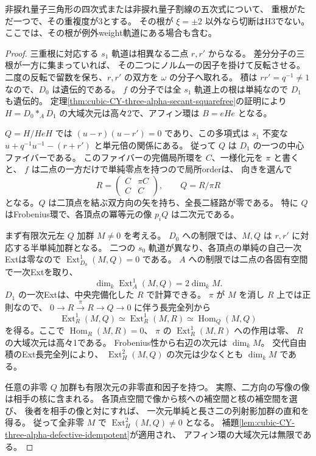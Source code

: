 \begin{proposition}\label{prop:cubic-CY-three-alpha-triple-unramified-root}
非捩れ量子三角形の四次式または非捩れ量子割線の五次式について、
重根がただ一つで、その重複度が3とする。
その根が $\xi=\pm2$ 以外なら切断はH3でない。
ここでは、その根が例外weight軌道にある場合も含む。
\end{proposition}
\begin{proof}
三重根に対応する $s_1$ 軌道は相異なる二点 $r,r'$ からなる。
差分分子の三根が一方に集まっていれば、
その二つにノルム一の因子を掛けて反転させる。
二度の反転で留数を保ち、$r,r'$ の双方を $\omega$ の分子へ取れる。
積は $rr'=q^{-1}\ne1$ なので、$D_0$ は遺伝的である。
$f$ の分子では全 $s_1$ 軌道上の根は単純なので $D_1$ も遺伝的。
定理\ref{thm:cubic-CY-three-alpha-secant-squarefree}の証明により
$H=D_0*_A D_1$ の大域次元は高々2で、アフィン環は $B=eHe$ となる。

$Q=H/HeH$ では $(u-r)(u-r')=0$ であり、この多項式は
$s_1$ 不変な $u+q^{-1}u^{-1}-(r+r')$ と単元倍の関係にある。
従って $Q$ は $D_1$ の一つの中心ファイバーである。
このファイバーの完備局所環を $C$、一様化元を $\pi$ と書くと、
$f$ は二点の一方だけで単純零点を持つので局所orderは、
向きを選んで
\[
 R=\begin{pmatrix}C&\pi C\\ C&C\end{pmatrix},\qquad Q=R/\pi R
\]
となる。$Q$ は二頂点を結ぶ双方向の矢を持ち、全長二経路が零である。
特に $Q$ はFrobenius環で、各頂点の冪等元の像 $p_iQ$ は二次元である。

まず有限次元左 $Q$ 加群 $M\ne0$ を考える。
$D_0$ への制限では、$M,Q$ は $r,r'$ に対応する半単純加群となる。
二つの $s_0$ 軌道が異なり、各頂点の単純の自己一次Extは零なので
$\operatorname{Ext}^1_{D_0}(M,Q)=0$ である。
$A$ への制限では二点の各固有空間で一次Extを取り、
\[
 \dim_k\operatorname{Ext}^1_A(M,Q)=2\dim_k M .
\]
$D_1$ の一次Extは、中央完備化した $R$ で計算できる。
$\pi$ が $M$ を消し $R$ 上では正則なので、
$0\to R\xrightarrow{\pi}R\to Q\to0$ に伴う長完全列から
\[
 \operatorname{Ext}^1_R(M,Q)\simeq\operatorname{Ext}^1_R(M,R)
 \simeq\operatorname{Hom}_Q(M,Q)
\]
を得る。ここで $\operatorname{Hom}_R(M,R)=0$、
$\pi$ の $\operatorname{Ext}^1_R(M,R)$ への作用は零、
$R$ の大域次元は高々1である。
Frobenius性から右辺の次元は $\dim_k M$。
交代自由積のExt長完全列により、
$\operatorname{Ext}^2_H(M,Q)$ の次元は少なくとも $\dim_k M$ である。

任意の非零 $Q$ 加群も有限次元の非零直和因子を持つ。
実際、二方向の写像の像は相手の核に含まれる。
各頂点空間で像から核への補空間と核の補空間を選び、
後者を相手の像と対にすれば、
一次元単純と長さ二の列射影加群の直和を得る。
従って全非零 $M$ で $\operatorname{Ext}^2_H(M,Q)\ne0$ となる。
補題\ref{lem:cubic-CY-three-alpha-defective-idempotent}が適用され、
アフィン環の大域次元は無限である。
\end{proof}

